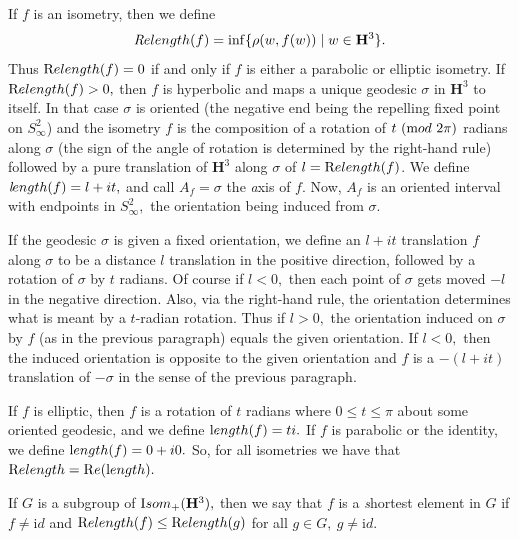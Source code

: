  \begin{definition}\label{GMT 1.2}
 If $f$ is an isometry, then we define
$${\textit Relength}(f)=\inf\{\rho(w,f(w))\mid w\in {\mathbf H}^3\}.$$
Thus ${\textrm Relength}(f)=0$ if and only if $f$ is either a parabolic or elliptic
isometry.  If ${\textrm Relength}(f) > 0,$ then $f$
is hyperbolic and maps a unique geodesic $\sigma$ in ${\mathbf H}^3$ to itself. In that case
$\sigma$ is oriented (the negative end
being the repelling fixed point on $S^2_\infty$)  and the isometry $f$ is the
composition of a  rotation of $t \ ({\textrm mod}\ 2\pi)$
radians along $\sigma$ (the sign of the angle of rotation is determined by the right-hand rule) followed by a pure translation of ${\mathbf H}^3$ along $\sigma$ of
$l = {\textrm Relength}(f)$.  We define
${\textit length}(f)=l+it,$ and call $A_f = \sigma$ the {\textit axis} of $f.$  Now,  $A_f$ is an oriented interval with endpoints in $S^2_{\infty},$ the
orientation being induced from $\sigma.$

If the geodesic $\sigma$ is  given a fixed orientation, we define an $l+it$
translation $f$ along $\sigma$  to be a distance $l$ translation in the positive
direction, followed by a rotation of $\sigma$ by $t$ radians.  Of course if
$l < 0,$ then each point of $\sigma$ gets moved $-l$ in the negative direction.
Also, via the right-hand rule, the orientation determines what is meant
by a $t$-radian rotation.  Thus if $l > 0,$ the orientation induced on
$\sigma$ by $f$ (as in the previous paragraph) equals the given orientation.
If $l < 0,$ then the induced orientation is opposite to the given orientation
and $f$ is a $-(l+it)$ translation of $-\sigma$ in the sense of the previous
paragraph.

If $f$ is elliptic, then $f$ is a rotation of $t$ radians where 
$0 \le t \le \pi$ about some oriented geodesic, and we define ${\textrm length}(f) = t i.$ 
If $f$ is parabolic or the identity, we define ${\textrm length}(f) = 0 + i0.$
So, for all isometries we have that ${\textrm Relength} = {\mathrm Re}({\textrm length}).$
\end{definition}

\begin{definition} \label{GMT 1.3}  If
$G$ is a subgroup of ${\textrm Isom}_+({\mathbf H}^3),$ then  we say that $f$ is a {\textit shortest} element  in $G$ if $f\neq {\mathrm id}$ and
${\textrm Relength}(f)\le {\textrm Relength}(g)$
for all $g\in G, \ g\neq {\mathrm id}.$
\end{definition}
 
